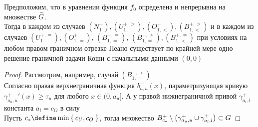 \begin{theorem}\label{th:ex:bound:1}
    Предположим, что в уравнении  функция $ f_0 $ определена и непрерывна на множестве $ \widetilde{G} $. \\
    Тогда в каждом из случаев $ (N_1^+), (U_1^{+, >}), (O_{1, <}^+), (B_{1, <}^{+, >}) $ и в каждом из случаев $ (U_1^{+, =}), (O_{1, =}^+) $, $ (B_{1, =}^{+, =}) $, $ (B_{1, =}^{+, >}), (B_{1, <}^{+, =}) $ при условиях  на любом правом граничном отрезке Пеано существует по крайней мере одно решение граничной задачи Коши с начальными данными $ (0, 0) $
\end{theorem}

\begin{proof}
    Рассмотрим, например, случай $ (B_{1, =}^{+, >}) $ \\
    Согласно   правая верхнеграничная функция $ b_{a, u}^+(x) $, параметризующая кривую $ \gamma_{a_u, u}^+{}'(x) \ge \tau_u $ для любого $ x \in (0, a_u] $. А у правой нижнеграничной привой $ \gamma_{a_l, l}^+ $ константа $ a_l = c_O $ в силу   \\
    Пусть $ c_* \define \min\set{c_U, c_O} $, тогда множество $ B_{c_*}^+ \setminus \big( \gamma_{a_u, u}^+ \cup \gamma_{a_l, l}^+ \big) \subset G $


\end{proof}
